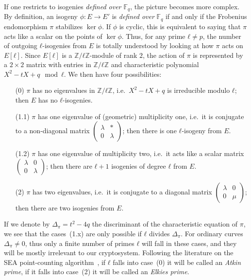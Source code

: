 \documentclass{article}
\newcommand{\F}{\mathbb{F}}
\theoremstyle{definition}
\begin{document}
If one restricts to isogenies \emph{defined over $\F_q$}, the picture
becomes more complex.  By definition, an isogeny $ϕ:E→E'$ is
\emph{defined over} $\F_q$ if and only if the Frobenius endomorphism
$π$ stabilizes $\ker ϕ$. If $ϕ$ is cyclic, this is equivalent to
saying that $π$ acts like a scalar on the points of $\ker ϕ$.  Thus,
for any prime $ℓ≠p$, the number of outgoing $ℓ$-isogenies from $E$ is
totally understood by looking at how $π$ acts on $E[ℓ]$. Since $E[ℓ]$
is a $ℤ/ℓℤ$-module of rank $2$, the action of $π$ is represented by a
$2×2$ matrix with entries in $ℤ/ℓℤ$ and characteristic polynomial
$X^2-tX+q\mod ℓ$. We then have four possibilities:
\begin{itemize}
\item[(0)] $π$ has no eigenvalues in $ℤ/ℓℤ$, i.e.\ $X^2-tX+q$ is
  irreducible modulo $ℓ$; then $E$ has no $ℓ$-isogenies.
\item[(1.1)] $π$ has one eigenvalue of (geometric) multiplicity one,
  i.e.\ it is conjugate to a non-diagonal matrix
  $\left(\begin{smallmatrix}λ&*\\0&λ\end{smallmatrix}\right)$; then
  there is one $ℓ$-isogeny from $E$.
\item[(1.2)] $π$ has one eigenvalue of multiplicity two, i.e.\ it acts
  like a scalar matrix
  $\left(\begin{smallmatrix}λ&0\\0&λ\end{smallmatrix}\right)$; then
  there are $ℓ+1$ isogenies of degree $ℓ$ from $E$.
\item[(2)] $π$ has two eigenvalues, i.e.\ it is conjugate to a
  diagonal matrix
  $\left(\begin{smallmatrix}λ&0\\0&μ\end{smallmatrix}\right)$; then
  there are two isogenies from $E$.
\end{itemize}

If we denote by $Δ_π=t^2-4q$ the discriminant of the characteristic
equation of $π$, we see that the cases~(1.x) are only possible if $ℓ$
divides $Δ_π$.  For ordinary curves $Δ_π≠0$, thus only a finite number
of primes $ℓ$ will fall in these cases, and they will be mostly
irrelevant to our cryptosystem. Following the literature on the SEA
point-counting algorithm~\cite{schoof95,todo}, if $ℓ$ falls into
case~(0) it will be called an \emph{Atkin prime}, if it falls into
case~(2) it will be called an \emph{Elkies prime}.
\end{document}
